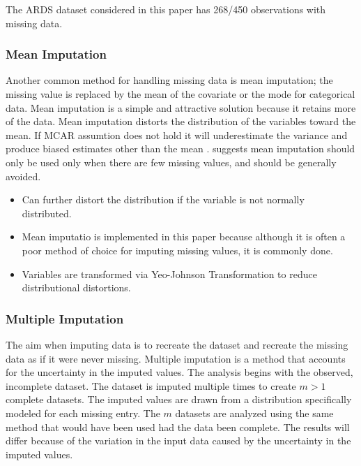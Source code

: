 \documentclass[12pt,]{article}
\providecommand{\tightlist}{%
  \setlength{\itemsep}{0pt}\setlength{\parskip}{0pt}}
\begin{document}
The ARDS dataset considered in this paper has 268/450 observations with
missing data.

\subsubsection{Mean Imputation}\label{mean-imputation}

Another common method for handling missing data is mean imputation; the
missing value is replaced by the mean of the covariate or the mode for
categorical data. Mean imputation is a simple and attractive solution
because it retains more of the data. Mean imputation distorts the
distribution of the variables toward the mean. If MCAR assumtion does
not hold it will underestimate the variance and produce biased estimates
other than the mean \citep{van_buuren_flexible_2012}.
\citep{van_buuren_flexible_2012} suggests mean imputation should only be
used only when there are few missing values, and should be generally
avoided.

\begin{itemize}
\tightlist
\item
  Can further distort the distribution if the variable is not normally
  distributed.\\
\item
  Mean imputatio is implemented in this paper because although it is
  often a poor method of choice for imputing missing values, it is
  commonly done.\\
\item
  Variables are transformed via Yeo-Johnson Transformation to reduce
  distributional distortions.
\end{itemize}

\subsubsection{Multiple Imputation}\label{multiple-imputation}

The aim when imputing data is to recreate the dataset and recreate the
missing data as if it were never missing. Multiple imputation is a
method that accounts for the uncertainty in the imputed values. The
analysis begins with the observed, incomplete dataset. The dataset is
imputed multiple times to create \(m>1\) complete datasets. The imputed
values are drawn from a distribution specifically modeled for each
missing entry. The \(m\) datasets are analyzed using the same method
that would have been used had the data been complete. The results will
differ because of the variation in the input data caused by the
uncertainty in the imputed values.
\end{document}
